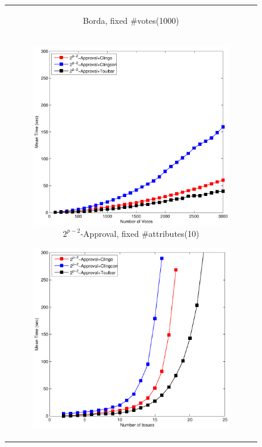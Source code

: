 \begin{figure}[ht!]
\begin{tabular}{c}
\begin{subfigure}[b]{0.44\textwidth}
		\captionsetup{font=scriptsize}
    \caption{Borda, fixed \#votes(1000)}
		\label{fig:comparison:win:2}
	\end{subfigure}
  \\
  \begin{subfigure}[b]{0.44\textwidth}
		\includegraphics[width=\textwidth]{figs/expAppFIMSCICP.pdf}
		\captionsetup{font=scriptsize}
    \caption{$2^{p-2}$-Approval, fixed \#attributes(10)}
		\label{fig:comparison:win:3}
	\end{subfigure}
  \begin{subfigure}[b]{0.44\textwidth}
		\includegraphics[width=\textwidth]{figs/expAppFVMSCICP.pdf}

\end{subfigure}
\end{tabular}
\end{figure}
